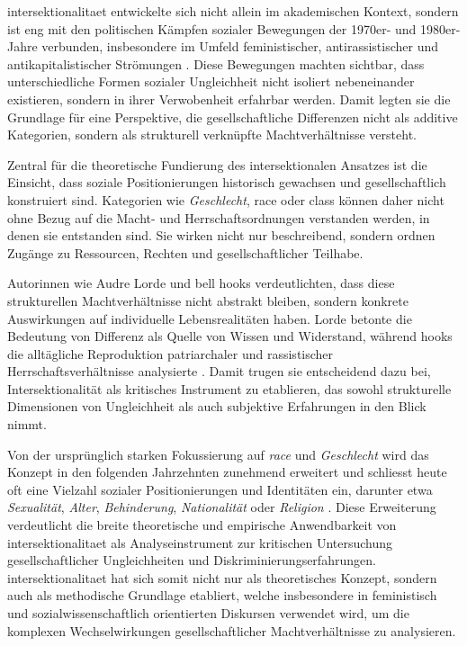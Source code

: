 \gls{intersektionalitaet} entwickelte sich nicht allein im akademischen Kontext, sondern ist eng mit den politischen Kämpfen sozialer Bewegungen der 1970er- und 1980er-Jahre verbunden, insbesondere im Umfeld feministischer, antirassistischer und antikapitalistischer Strömungen \parencite{collinsBlackFeministThought2002}. Diese Bewegungen machten sichtbar, dass unterschiedliche Formen sozialer Ungleichheit nicht isoliert nebeneinander existieren, sondern in ihrer Verwobenheit erfahrbar werden. Damit legten sie die Grundlage für eine Perspektive, die gesellschaftliche Differenzen nicht als additive Kategorien, sondern als strukturell verknüpfte Machtverhältnisse versteht.

Zentral für die theoretische Fundierung des intersektionalen Ansatzes ist die Einsicht, dass soziale Positionierungen historisch gewachsen und gesellschaftlich konstruiert sind. Kategorien wie \emph{Geschlecht}, \gls{race} oder \gls{class} können daher nicht ohne Bezug auf die Macht- und Herrschaftsordnungen verstanden werden, in denen sie entstanden sind. Sie wirken nicht nur beschreibend, sondern ordnen Zugänge zu Ressourcen, Rechten und gesellschaftlicher Teilhabe.

Autorinnen wie Audre Lorde und bell hooks verdeutlichten, dass diese strukturellen Machtverhältnisse nicht abstrakt bleiben, sondern konkrete Auswirkungen auf individuelle Lebensrealitäten haben. Lorde betonte die Bedeutung von Differenz als Quelle von Wissen und Widerstand, während hooks die alltägliche Reproduktion patriarchaler und rassistischer Herrschaftsverhältnisse analysierte \parencite{collinsBlackFeministThought2002, hancockWhenMultiplicationDoesnt2007}. Damit trugen sie entscheidend dazu bei, Intersektionalität als kritisches Instrument zu etablieren, das sowohl strukturelle Dimensionen von Ungleichheit als auch subjektive Erfahrungen in den Blick nimmt.

Von der ursprünglich starken Fokussierung auf \textit{race} und \emph{Geschlecht} wird das Konzept in den folgenden Jahrzehnten zunehmend erweitert und schliesst heute oft eine Vielzahl sozialer Positionierungen und Identitäten ein, darunter etwa \emph{Sexualität}, \emph{Alter}, \emph{Behinderung}, \emph{Nationalität} oder \emph{Religion} \parencite{bauerIntersectionalityQuantitativeResearch2021, bowlegInvitedReflectionQuantifying2016}. Diese Erweiterung verdeutlicht die breite theoretische und empirische Anwendbarkeit von \gls{intersektionalitaet} als Analyseinstrument zur kritischen Untersuchung gesellschaftlicher Ungleichheiten und Diskriminierungserfahrungen. \gls{intersektionalitaet} hat sich somit nicht nur als theoretisches Konzept, sondern auch als methodische Grundlage etabliert, welche insbesondere in feministisch und sozialwissenschaftlich orientierten Diskursen verwendet wird, um die komplexen Wechselwirkungen gesellschaftlicher Machtverhältnisse zu analysieren.

